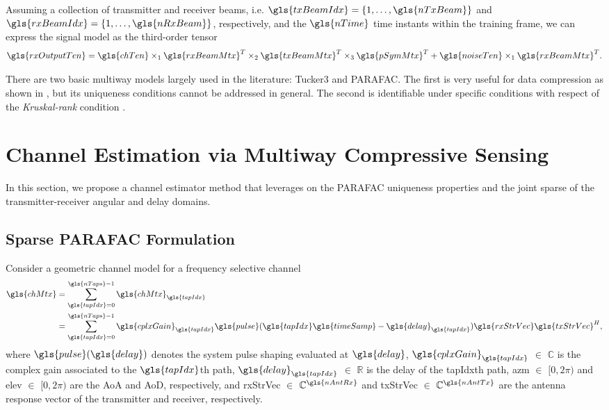 \documentclass[conference]{IEEEtran}
\begin{document}
Assuming a collection  of transmitter and receiver beams, i.e.
$\gls{txBeamIdx}=\{1,\ldots , \gls{nTxBeam} \}$ and $\gls{rxBeamIdx}=\{1,\ldots , \gls{nRxBeam} \}$, respectively, and the $\gls{nTime}$ time
instants within the training frame, we can express the signal model as the
third-order tensor \cite{Sidiropoulos:2000,Cichocki:2009}
\begin{equation}
  \label{eq:tensor_model}
  \gls{rxOutputTen} =   \gls{chTen}\times_1  \gls{rxBeamMtx}^T \times_2  \gls{txBeamMtx}^T \times_3 \gls{pSymMtx}^T + \gls{noiseTen} \times_1 \gls{rxBeamMtx}^T  .
\end{equation}


There are two basic multiway models largely used in the literature: Tucker3 and
\gls{PARAFAC}. The first  is very useful for data compression
as shown in \cite{Duarte:2012}, but its uniqueness conditions cannot be
addressed in general. The second is identifiable  under specific
conditions with respect of the \textit{Kruskal-rank} condition
\cite{Sidiropoulos:2000,Smilde:2004}. %


\section{Channel Estimation via Multiway Compressive Sensing}
\label{sec:multiway_cs}

In this section, we propose a channel estimator method that leverages on the
\gls{PARAFAC} uniqueness properties and the joint sparse of the transmitter-receiver
angular and delay domains. 


\subsection{Sparse \gls{PARAFAC} Formulation}
\label{sec:parafac_model}

Consider a geometric  channel model for a frequency selective channel
\begin{align}
  \label{eq:tap_model}
  \gls{chMtx} & = \sum_{\gls{tapIdx}=0}^{\gls{nTaps}-1}  \gls{chMtx}_{\gls{tapIdx}} \nonumber \\
              & = \sum_{\gls{tapIdx}=0}^{\gls{nTaps}-1}\gls{cplxGain}_{\gls{tapIdx}}\gls{pulse}(\gls{tapIdx}\gls{timeSamp} - \gls{delay}_{\gls{tapIdx}})\gls{rxStrVec}\gls{txStrVec}^H,
\end{align}
where $\gls{pulse}(\gls{delay})$
denotes the system pulse shaping evaluated at
$\gls{delay}$, $\gls{cplxGain}_{\gls{tapIdx}}$ $\in$ $\mathbb{C}$ is the complex
gain associated to the $\gls{tapIdx}$th path, $\gls{delay}_{\gls{tapIdx}}$ $\in$
$\mathbb{R}$ is the delay of the \gls{tapIdx}th path, \gls{azm} $\in$ $[0,2\pi)$
and \gls{elev} $\in$ $[0,2\pi)$ are the \gls{AoA} and \gls{AoD},
respectively, and \gls{rxStrVec} $\in$ $\mathbb{C}^{\gls{nAntRx}}$ and
\gls{txStrVec} $\in$ $\mathbb{C}^{\gls{nAntTx}}$ are the antenna response vector
of the transmitter and receiver, respectively. 
\end{document}
